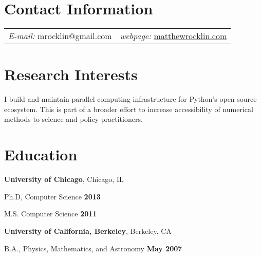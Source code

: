 \documentclass[margin,line]{res}
\newenvironment{list1}{
  \begin{list}{\ding{113}}{%
      \setlength{\itemsep}{0in}
      \setlength{\parsep}{0in} \setlength{\parskip}{0in}
      \setlength{\topsep}{0in} \setlength{\partopsep}{0in}
      \setlength{\leftmargin}{0.17in}}}{\end{list}}
\begin{document}
\newcommand{\link}[1]{\texttt{#1}}
\providecommand{\tightlist}{%
      \setlength{\itemsep}{0pt}\setlength{\parskip}{0pt}}



\begin{resume}
\section{\sc Contact Information}
\vspace{.05in}
\begin{tabular}{@{}p{2in}p{4in}}
{\it E-mail:}  mrocklin@gmail.com   & {\it webpage:} \href{https://matthewrocklin.com}{matthewrocklin.com} \\
\end{tabular}


\section{\sc Research Interests}

I build and maintain parallel computing infrastructure for Python's open source ecosystem.
This is part of a broader effort to increase accessibility of numerical methods to science and policy practitioners.

\section{\sc Education}
{\bf University of Chicago}, Chicago, IL\\
\vspace*{-.1in}
\begin{list1}
\item[] Ph.D, Computer Science \hfill {\bf 2013}
\item[] M.S. Computer Science \hfill {\bf 2011}
\end{list1}

{\bf University of California, Berkeley}, Berkeley, CA\\
\vspace*{-.1in}
\begin{list1}
\item[] B.A., Physics, Mathematics, and Astronomy \hfill {\bf May 2007}
\end{list1}


\end{resume}
\end{document}
